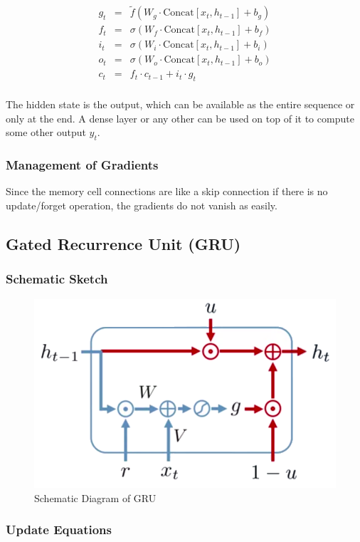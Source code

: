 \begin{eqnarray}
	g_t &=& \tilde{f}(W_g \cdot \text{Concat}[x_t, h_{t - 1}] + b_g) \\
	f_t &=& \sigma(W_f \cdot \text{Concat}[x_t, h_{t - 1}] + b_f) \\
	i_t &=& \sigma(W_i \cdot \text{Concat}[x_t, h_{t - 1}] + b_i) \\
	o_t &=& \sigma(W_o \cdot \text{Concat}[x_t, h_{t - 1}] + b_o) \\
	c_t &=& f_t \cdot c_{t - 1} + i_t \cdot g_t \\
\end{eqnarray}

The hidden state is the output, which can be available as the entire sequence or only at the end. A dense layer or any other can be used on top of it to compute some other output $y_t$.

\subsubsection{Management of Gradients}

Since the memory cell connections are like a skip connection if there is no update/forget operation, the gradients do not vanish as easily.


\subsection{Gated Recurrence Unit (GRU)}

\subsubsection{Schematic Sketch}

\begin{figure}[H]
	\centering
	\includegraphics[width=0.9\linewidth]{img/aml/gru-schematic.png}
	\caption{Schematic Diagram of GRU}
	\label{fig:gru-schmatic}
\end{figure}

\subsubsection{Update Equations}

